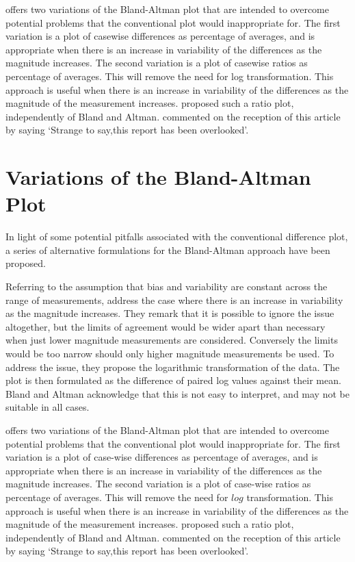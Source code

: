 \documentclass[Main.tex]{subfiles}
\begin{document}
	\citet{BA99} offers two variations of the Bland-Altman plot that
	are intended to overcome potential problems that the conventional
	plot would inappropriate for. The first variation is a plot of
	casewise differences as percentage of averages, and is appropriate
	when there is an increase in variability of the differences as the
	magnitude increases. The second variation is a plot of casewise
	ratios as percentage of averages. This will remove the need for
	log transformation. This approach is useful when there is an
	increase in variability of the differences as the magnitude of the
	measurement increases. \citet{Eksborg} proposed such a ratio plot,
	independently of Bland and Altman. \citet{Dewitte} commented on
	the reception of this article by saying `Strange to say,this
	report has been overlooked'.
	
	
	
	

\section{Variations of the Bland-Altman Plot} 
In light of some potential pitfalls associated with the conventional difference plot, a series of alternative formulations for the Bland-Altman approach have been proposed.

Referring to the assumption that bias and variability are constant across the range
of measurements, \citet{BA99} address the case where there is an increase in variability as the magnitude increases. They remark 	that it is possible to ignore the issue altogether, but the limits of agreement would be wider apart than necessary when just lower magnitude measurements are considered. Conversely the limits would be too narrow should only higher magnitude measurements be used.	To address the issue, they propose the logarithmic transformation of the data. The plot is then formulated as the difference of paired log values against their mean. Bland and Altman acknowledge that this is not easy to interpret, and may not be suitable in all cases.

\citet{BA99} offers two variations of the Bland-Altman plot that are intended to overcome potential problems that the conventional
plot would inappropriate for. The first variation is a plot of case-wise differences as percentage of averages, and is appropriate when there is an increase in variability of the differences as the magnitude increases. The second variation is a
plot of case-wise ratios as percentage of averages. This will remove the need for $log$ transformation. This approach is useful
when there is an increase in variability of the differences as the magnitude of the measurement increases. \citet{Eksborg} proposed
such a ratio plot, independently of Bland and Altman. \citet{Dewitte} commented on the reception of this article by
saying `Strange to say,this report has been overlooked'.
\end{document}
